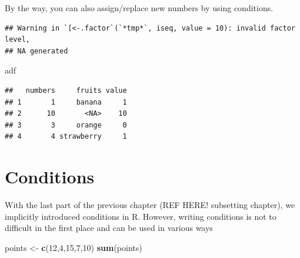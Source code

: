\documentclass[]{report}
\newenvironment{Shaded}{\begin{snugshade}}{\end{snugshade}}
\newcommand{\KeywordTok}[1]{\textcolor[rgb]{0.13,0.29,0.53}{\textbf{#1}}}
\newcommand{\DataTypeTok}[1]{\textcolor[rgb]{0.13,0.29,0.53}{#1}}
\newcommand{\DecValTok}[1]{\textcolor[rgb]{0.00,0.00,0.81}{#1}}
\newcommand{\StringTok}[1]{\textcolor[rgb]{0.31,0.60,0.02}{#1}}
\newcommand{\OperatorTok}[1]{\textcolor[rgb]{0.81,0.36,0.00}{\textbf{#1}}}
\newcommand{\NormalTok}[1]{#1}
\begin{document}
By the way, you can also assign/replace new numbers by using conditions.

\begin{Shaded}
\end{Shaded}

\begin{verbatim}
## Warning in `[<-.factor`(`*tmp*`, iseq, value = 10): invalid factor level,
## NA generated
\end{verbatim}

\begin{Shaded}
\begin{Highlighting}[]
\NormalTok{adf}
\end{Highlighting}
\end{Shaded}

\begin{verbatim}
##   numbers     fruits value
## 1       1     banana     1
## 2      10       <NA>    10
## 3       3     orange     0
## 4       4 strawberry     1
\end{verbatim}

\section{Conditions}\label{conditions}

With the last part of the previous chapter (REF HERE! subsetting
chapter), we implicitly introduced conditions in R. However, writing
conditions is not to difficult in the first place and can be used in
various ways

\begin{Shaded}
\begin{Highlighting}[]
\NormalTok{points <-}\StringTok{ }\KeywordTok{c}\NormalTok{(}\DecValTok{12}\NormalTok{,}\DecValTok{4}\NormalTok{,}\DecValTok{15}\NormalTok{,}\DecValTok{7}\NormalTok{,}\DecValTok{10}\NormalTok{)}
\KeywordTok{sum}\NormalTok{(points)}
\end{Highlighting}
\end{Shaded}
\end{document}
